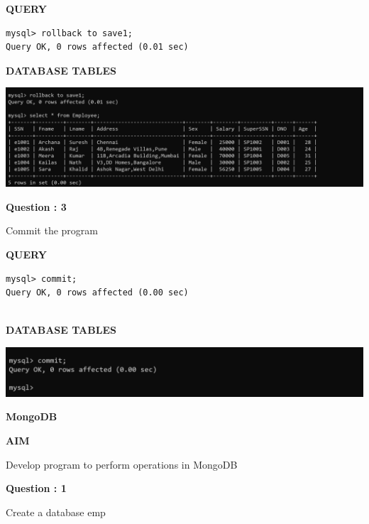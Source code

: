 \documentclass[a4paper,12pt]{report}
\begin{document}
\begin{flushleft}
\textbf{QUERY }
\end{flushleft}
 \begin{verbatim}
mysql> rollback to save1;
Query OK, 0 rows affected (0.01 sec)

\end{verbatim}
\begin{flushleft}
\textbf{DATABASE TABLES}
\end{flushleft}
\includegraphics[scale=0.35]{tcl3.png}
\begin{flushleft}
    \textbf{Question : 3}
\end{flushleft}
Commit the program

\begin{flushleft}
\textbf{QUERY }
\end{flushleft}
 \begin{verbatim}
mysql> commit;
Query OK, 0 rows affected (0.00 sec)


\end{verbatim}
\begin{flushleft}
\textbf{DATABASE TABLES}
\end{flushleft}
\includegraphics[scale=0.45]{tcl4.png}


\newpage
\newpage
\begin{center}
\large\textbf{MongoDB}
\end{center}

\begin{flushleft}
\textbf{AIM }
\end{flushleft}
Develop program to perform operations in MongoDB

\begin{flushleft}
    \textbf{Question : 1}
\end{flushleft}
Create a database emp
\end{document}

